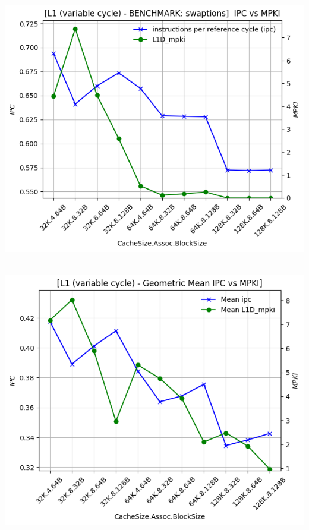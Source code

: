 \begin{minipage}{\textwidth}
    \begin{center}
        \\
        \vspace{3mm}
        \includegraphics[scale=0.65]{graphs/L1/var/swaptions.png}
        \vspace{6mm}
    \end{center}
\end{minipage}

\begin{minipage}{\textwidth}
    \begin{center}
        \\
        \vspace{3mm}
        \includegraphics[scale=0.60]{graphs/L1/var/mean.png}
        \vspace{6mm}
    \end{center}
\end{minipage}

